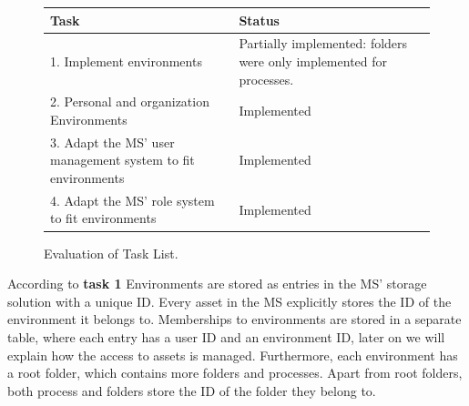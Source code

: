 \begin{figure}[H]
	\centering

	\begin{tabular}{ | m{20em} | m{17em}| }
		\hline
		 Task & Status \\
     \hline
      1. Implement environments &  Partially implemented: folders were only implemented for processes. \\
     \hline
      2. Personal and organization Environments &  Implemented \\
     \hline
      3. Adapt the MS' user management system to fit environments &  Implemented \\
     \hline
      4. Adapt the MS' role system to fit environments &  Implemented \\
     \hline
	\end{tabular}

	\caption{Evaluation of Task List.}
	\label{fig:task-list-functional-quick-evaluation}
\end{figure}

According to \textbf{task 1} Environments are stored as entries in the MS' storage
solution with a unique ID.
Every asset in the MS explicitly stores the ID of the environment it belongs to.
Memberships to environments are stored in a separate table, where each entry has a user ID
and an environment ID,
later on we will explain how the access to assets is managed.
Furthermore, each environment has a root folder, which contains more folders and
processes.
Apart from root folders, both process and folders store the ID of the folder they belong
to.

